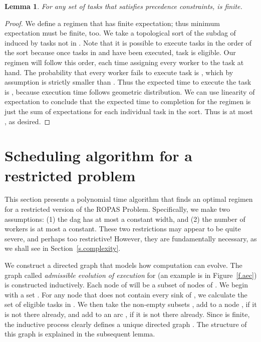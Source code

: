 \documentclass[letterpaper,11pt]{article}
\newtheorem{lemma}[theorem]{Lemma}
\newcommand{\remove}[1]{}
\begin{document}
\begin{lemma}
\label{l.finite}
For any set  of tasks that satisfies precedence constraints,  is finite.
\end{lemma}

\remove{**********************
\begin{proof}[sketch]
We take a topological sort, and assign all workers to successive unexecuted tasks. This yields a finite expectation, so  must be finite, too.
\end{proof}
**********************}

\begin{proof}
We define a regimen that has finite expectation; thus minimum expectation must be finite, too. We take a topological sort  of the subdag of  induced by tasks not in . Note that it is possible to execute tasks in the order of the sort because once tasks in  and  have been executed, task  is eligible. Our regimen will follow this order, each time assigning every worker to the task at hand. The probability that every worker fails to execute task  is , which by assumption is strictly smaller than . Thus the expected time to execute the task is , because execution time follows geometric distribution. We can use linearity of expectation to conclude that the expected time to completion for the regimen is just the sum of expectations for each individual task in the sort. Thus  is at most , as desired. 
\end{proof}






\section{Scheduling algorithm for a restricted problem}
\label{s.alg}

This section presents a polynomial time algorithm that finds an optimal regimen for a restricted version of the ROPAS Problem. Specifically, we make two assumptions: (1) the dag  has at most a constant width, and (2) the number of workers is at most a constant. These two restrictions may appear to be quite severe, and perhaps too restrictive! However, they are fundamentally necessary, as we shall see in Section~\ref{s.complexity}.


We construct a directed graph that models how computation can evolve. The graph  called {\em admissible evolution of execution} for  (an example is in Figure~\ref{f.aec}) is constructed inductively. Each node of  will be a subset of nodes of . We begin with a set . For any node  that does not contain every sink of , we calculate the set of eligible tasks  in . We then take the non-empty subsets , add to  a node , if it is not there already, and add to  an arc , if it is not there already. Since  is finite, the inductive process clearly defines a unique directed graph . The structure of this graph is explained in the subsequent lemma.
\end{document}
